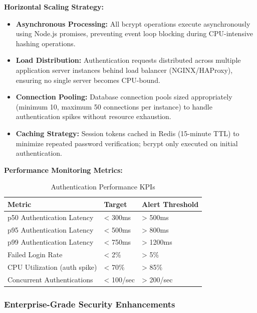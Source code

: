 \documentclass[12pt,a4paper]{article}
\begin{document}
\vspace{0.5em}

\textbf{Horizontal Scaling Strategy:}

\begin{itemize}[leftmargin=2em, itemsep=6pt]
    \item \textbf{Asynchronous Processing:} All bcrypt operations execute asynchronously using Node.js promises, preventing event loop blocking during CPU-intensive hashing operations.
    \item \textbf{Load Distribution:} Authentication requests distributed across multiple application server instances behind load balancer (NGINX/HAProxy), ensuring no single server becomes CPU-bound.
    \item \textbf{Connection Pooling:} Database connection pools sized appropriately (minimum 10, maximum 50 connections per instance) to handle authentication spikes without resource exhaustion.
    \item \textbf{Caching Strategy:} Session tokens cached in Redis (15-minute TTL) to minimize repeated password verification; bcrypt only executed on initial authentication.
\end{itemize}

\vspace{0.5em}

\textbf{Performance Monitoring Metrics:}

\begin{table}[H]
\centering
\begin{tabular}{|p{5cm}|p{4cm}|p{4cm}|}
\hline
\textbf{Metric} & \textbf{Target} & \textbf{Alert Threshold} \\
\hline
p50 Authentication Latency & < 300ms & > 500ms \\
\hline
p95 Authentication Latency & < 500ms & > 800ms \\
\hline
p99 Authentication Latency & < 750ms & > 1200ms \\
\hline
Failed Login Rate & < 2\% & > 5\% \\
\hline
CPU Utilization (auth spike) & < 70\% & > 85\% \\
\hline
Concurrent Authentications & < 100/sec & > 200/sec \\
\hline
\end{tabular}
\caption{Authentication Performance KPIs}
\end{table}

\subsubsection{Enterprise-Grade Security Enhancements}
\end{document}
